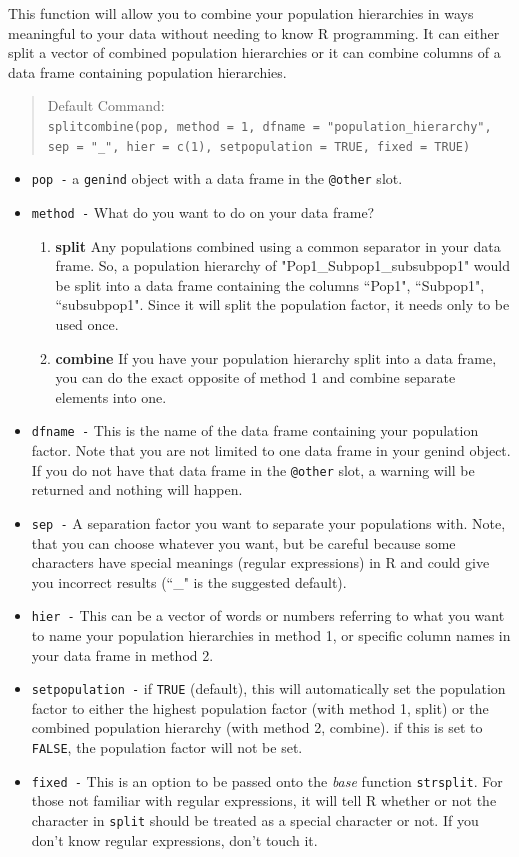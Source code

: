 \documentclass[letterpaper]{article}
\newcommand{\tab}{\hspace*{1em}}
\begin{document}
\tab\tab This function will allow you to combine your population hierarchies in ways meaningful to your data without needing to know R programming. It can either split a vector of combined population hierarchies or it can combine columns of a data frame containing population hierarchies. 
\begin{quote}
Default Command:\\
\texttt{splitcombine(pop, method = 1, dfname = "population\_hierarchy", sep = "\_", hier = c(1), setpopulation = TRUE, fixed = TRUE)}
\end{quote}
\begin{itemize}
  \item \texttt{pop -} a \texttt{genind} object with a data frame in the \texttt{@other} slot.
  \item \texttt{method -} What do you want to do on your data frame?
  \begin{enumerate}
    \item \textbf{split} Any populations combined using a common separator in your data frame. So, a population hierarchy of "Pop1\_Subpop1\_subsubpop1" would be split into a data frame containing the columns ``Pop1", ``Subpop1", ``subsubpop1". Since it will split the population factor, it needs only to be used once. 
    \item \textbf{combine} If you have your population hierarchy split into a data frame, you can do the exact opposite of method 1 and combine separate elements into one.
  \end{enumerate}
  \item \texttt{dfname -} This is the name of the data frame containing your population factor. Note that you are not limited to one data frame in your genind object. If you do not have that data frame in the \texttt{@other} slot, a warning will be returned and nothing will happen.
  \item \texttt{sep -} A separation factor you want to separate your populations with. Note, that you can choose whatever you want, but be careful because some characters have special meanings (regular expressions) in R and could give you incorrect results (``\_" is the suggested default).
  \item \texttt{hier -} This can be a vector of words or numbers referring to what you want to name your population hierarchies in method 1, or specific column names in your data frame in method 2. 
  \item \texttt{setpopulation -} if \texttt{TRUE} (default), this will automatically set the population factor to either the highest population factor (with method 1, split) or the combined population hierarchy (with method 2, combine). if this is set to \texttt{FALSE}, the population factor will not be set.
  \item \texttt{fixed -} This is an option to be passed onto the \textit{base} function \texttt{strsplit}. For those not familiar with regular expressions, it will tell R whether or not the character in \texttt{split} should be treated as a special character or not. If you don't know regular expressions, don't touch it.
\end{itemize}
\end{document}

